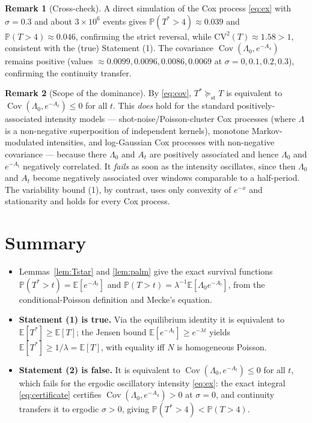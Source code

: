 \documentclass{amsart}
\theoremstyle{plain}
\theoremstyle{definition}
\newtheorem{remark}{Remark}
\newcommand{\E}{\mathbb{E}}
\newcommand{\Prob}{\mathbb{P}}
\newcommand{\Lam}{\Lambda}
\DeclareMathOperator{\Cov}{Cov}
\begin{document}
\begin{remark}[Cross-check]
A direct simulation of the Cox process \eqref{eq:ex} with $\sigma=0.3$ and about
$3\times10^6$ events gives $\Prob(T^\ast>4)\approx0.039$ and $\Prob(T>4)\approx0.046$,
confirming the strict reversal, while $\mathrm{CV}^2(T)\approx1.58>1$, consistent with
the (true) Statement (1). The covariance $\Cov(\Lam_0,e^{-A_4})$ remains positive
(values $\approx0.0099,0.0096,0.0086,0.0069$ at $\sigma=0,0.1,0.2,0.3$), confirming the
continuity transfer.
\end{remark}

\begin{remark}[Scope of the dominance]
By \eqref{eq:cov}, $T^\ast\succeq_{\mathrm{st}}T$ is equivalent to
$\Cov(\Lam_0,e^{-A_t})\le0$ for all $t$. This \emph{does} hold for the standard
positively-associated intensity models — shot-noise/Poisson-cluster Cox processes
(where $\Lam$ is a non-negative superposition of independent kernels), monotone
Markov-modulated intensities, and log-Gaussian Cox processes with non-negative
covariance — because there $\Lam_0$ and $A_t$ are positively associated and hence
$\Lam_0$ and $e^{-A_t}$ negatively correlated. It \emph{fails} as soon as the intensity
oscillates, since then $\Lam_0$ and $A_t$ become negatively associated over windows
comparable to a half-period. The variability bound (1), by contrast, uses only
convexity of $e^{-x}$ and stationarity and holds for every Cox process.
\end{remark}

\section*{Summary}
\begin{itemize}
\item Lemmas~\ref{lem:Tstar} and \ref{lem:palm} give the exact survival functions
$\Prob(T^\ast>t)=\E[e^{-A_t}]$ and $\Prob(T>t)=\lambda^{-1}\E[\Lam_0 e^{-A_t}]$, from
the conditional-Poisson definition and Mecke's equation.
\item \textbf{Statement (1) is true.} Via the equilibrium identity it is equivalent to
$\E[T^\ast]\ge\E[T]$; the Jensen bound $\E[e^{-A_t}]\ge e^{-\lambda t}$ yields
$\E[T^\ast]\ge1/\lambda=\E[T]$, with equality iff $N$ is homogeneous Poisson.
\item \textbf{Statement (2) is false.} It is equivalent to
$\Cov(\Lam_0,e^{-A_t})\le0$ for all $t$, which fails for the ergodic oscillatory
intensity \eqref{eq:ex}: the exact integral \eqref{eq:certificate} certifies
$\Cov(\Lam_0,e^{-A_4})>0$ at $\sigma=0$, and continuity transfers it to ergodic
$\sigma>0$, giving $\Prob(T^\ast>4)<\Prob(T>4)$.
\end{itemize}
\end{document}
